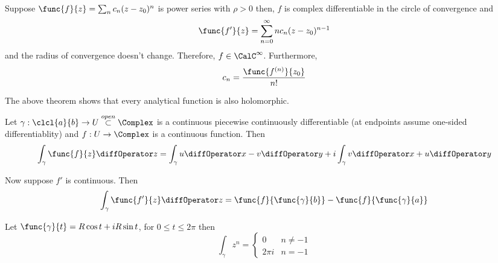 \begin{theorem}
    Suppose \(\func{f}{z} = \sum_n c_n (z - z_0)^n\) is power series with \(\rho > 0\) then, \(f\) is complex differentiable in the circle of convergence and 
        \begin{equation*}
            \func{f'}{z} = \sum_{n= 0}^\infty n c_n (z - z_0)^{n-1}
        \end{equation*}
        and the radius of convergence doesn't change. Therefore, \(f \in \CalC^\infty\). Furthermore, 
        \begin{equation*}
            c_n = \dfrac{\func{f^{(n)}}{z_0}}{n!}
        \end{equation*}
\end{theorem}

The above theorem shows that every analytical function is also holomorphic. 

Let \(\gamma : \clcl{a}{b} \to U \overset{open}{\subset} \Complex\) is a continuous piecewise continuously differentiable (at endpoints assume one-sided differentiablity) and \(f : U \to \Complex\)  is a continuous function. Then 
\begin{equation*}
    \int_{\gamma} \func{f}{z} \diffOperator z = \int_{\gamma} u \diffOperator x - v \diffOperator y + i \int_{\gamma} v \diffOperator x + u \diffOperator y
\end{equation*}

Now suppose \(f'\) is continuous. Then 
\begin{equation*}
    \int_{\gamma} \func{f'}{z} \diffOperator z = \func{f}{\func{\gamma}{b}} -  \func{f}{\func{\gamma}{a }}
\end{equation*}

\begin{example}
    Let \(\func{\gamma}{t} = R \cos t + i R \sin t\), for \(0 \leq t \leq 2\pi\) then 
    \begin{equation*}
        \int_{\gamma} z^n = \begin{cases}
            0 & n \neq -1\\
            2\pi i & n = -1
        \end{cases}
    \end{equation*}
\end{example}


